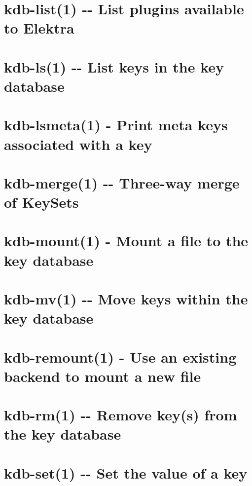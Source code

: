 \documentclass[twoside]{book}
\newcommand{\+}{\discretionary{\mbox{\scriptsize$\hookleftarrow$}}{}{}}
\begin{document}
\chapter{kdb-\/list(1) -\/-\/ List plugins available to Elektra}
\label{md_doc_help_kdb-list}
\hypertarget{md_doc_help_kdb-list}{}

\chapter{kdb-\/ls(1) -\/-\/ List keys in the key database}
\label{md_doc_help_kdb-ls}
\hypertarget{md_doc_help_kdb-ls}{}

\chapter{kdb-\/lsmeta(1) -\/ Print meta keys associated with a key}
\label{md_doc_help_kdb-lsmeta}
\hypertarget{md_doc_help_kdb-lsmeta}{}

\chapter{kdb-\/merge(1) -\/-\/ Three-\/way merge of Key\+Sets}
\label{md_doc_help_kdb-merge}
\hypertarget{md_doc_help_kdb-merge}{}

\chapter{kdb-\/mount(1) -\/ Mount a file to the key database}
\label{md_doc_help_kdb-mount}
\hypertarget{md_doc_help_kdb-mount}{}

\chapter{kdb-\/mv(1) -\/-\/ Move keys within the key database}
\label{md_doc_help_kdb-mv}
\hypertarget{md_doc_help_kdb-mv}{}

\chapter{kdb-\/remount(1) -\/ Use an existing backend to mount a new file}
\label{md_doc_help_kdb-remount}
\hypertarget{md_doc_help_kdb-remount}{}

\chapter{kdb-\/rm(1) -\/-\/ Remove key(s) from the key database}
\label{md_doc_help_kdb-rm}
\hypertarget{md_doc_help_kdb-rm}{}

\chapter{kdb-\/set(1) -\/-\/ Set the value of a key}
\label{md_doc_help_kdb-set}
\hypertarget{md_doc_help_kdb-set}{}

\end{document}

